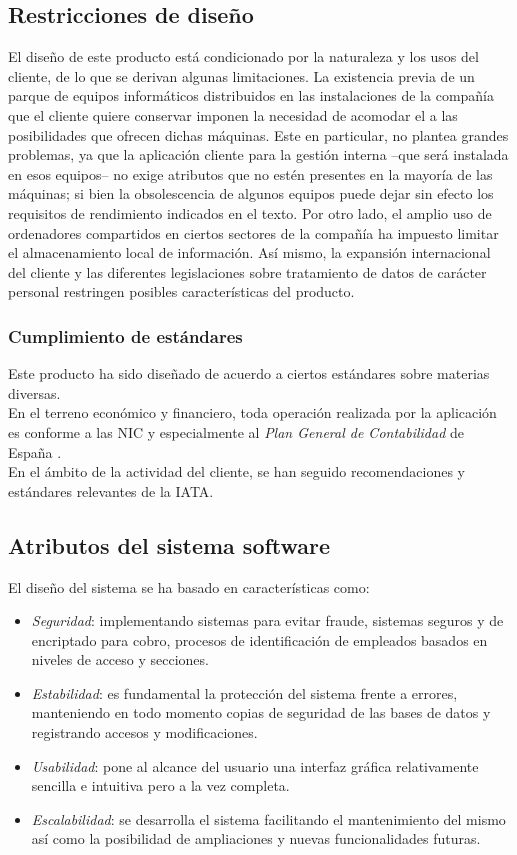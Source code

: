 \documentclass[11pt, a4paper, twoside, titlepage]{article}
\begin{document}
		\subsection{Restricciones de diseño}
			El diseño de este producto está condicionado por la naturaleza y los usos del cliente, de lo que se derivan algunas limitaciones. La existencia previa de un parque de equipos informáticos distribuidos en las instalaciones de la compañía que el cliente quiere conservar imponen la necesidad de acomodar el \software a las posibilidades que ofrecen dichas máquinas. Este en particular, no plantea grandes problemas, ya que la aplicación cliente para la gestión interna --que será instalada en esos equipos-- no exige atributos que no estén presentes en la mayoría de las máquinas; si bien la obsolescencia de algunos equipos puede dejar sin efecto los requisitos de rendimiento indicados en el texto. Por otro lado, el amplio uso de ordenadores compartidos en ciertos sectores de la compañía ha impuesto limitar el almacenamiento local de información. Así mismo, la expansión internacional del cliente y las diferentes legislaciones sobre tratamiento de datos de carácter personal restringen posibles características del producto.
			\subsubsection{Cumplimiento de estándares}
				Este producto ha sido diseñado de acuerdo a ciertos estándares sobre materias diversas.\\
				
				En el terreno económico y financiero, toda operación realizada por la aplicación es conforme a las \gls{NIC} \cite{NIC2006} y especialmente al \textit{Plan General de Contabilidad} de España \cite{PGC2007}.\\

				En el ámbito de la actividad del cliente, se han seguido recomendaciones y estándares relevantes de la \gls{IATA}.
				
		\subsection{Atributos del sistema software}
			El diseño del sistema se ha basado en características como:
			\begin{itemize}
				\item \textit{Seguridad}: implementando sistemas para evitar fraude, sistemas seguros y de encriptado para cobro, procesos de identificación de empleados basados en niveles de acceso y secciones.
				\item \textit{Estabilidad}: es fundamental la protección del sistema frente a errores, manteniendo en todo momento copias de seguridad de las bases de datos y registrando accesos y modificaciones.
				\item \textit{\gls{Usabilidad}}: pone al alcance del usuario una interfaz gráfica relativamente sencilla e intuitiva pero a la vez completa.
				\item \textit{Escalabilidad}: se desarrolla el sistema facilitando el mantenimiento del mismo así como la posibilidad de ampliaciones y nuevas funcionalidades futuras.
			\end{itemize}
	
\end{document}
